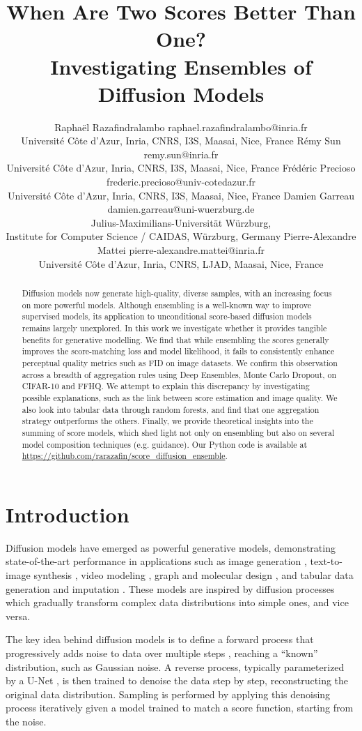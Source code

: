 \documentclass[10pt]{article} %
\title{When Are Two Scores Better Than One? \\ Investigating Ensembles of Diffusion Models}
\author{\name Raphaël Razafindralambo \email raphael.razafindralambo@inria.fr \\
      \addr Université Côte d’Azur, Inria, CNRS, I3S, Maasai, Nice, France
      \AND
      \name Rémy Sun \email remy.sun@inria.fr \\
      \addr Université Côte d’Azur, Inria, CNRS, I3S, Maasai, Nice, France
      \AND
      \name Frédéric Precioso \email frederic.precioso@univ-cotedazur.fr\\
      \addr Université Côte d’Azur, Inria, CNRS, I3S, Maasai, Nice, France
      \AND
      \name Damien Garreau \email damien.garreau@uni-wuerzburg.de\\
      \addr Julius-Maximilians-Universität Würzburg, \\ Institute for Computer Science / CAIDAS, Würzburg, Germany
      \AND
      \name Pierre-Alexandre Mattei \email pierre-alexandre.mattei@inria.fr \\
      \addr Université Côte d’Azur, Inria, CNRS, LJAD, Maasai, Nice, France}
\newcommand{\engquote}[1]{``#1''}
\begin{document}
\maketitle

\begin{abstract}
Diffusion models now generate high-quality, diverse samples, with an increasing focus on more powerful models. Although ensembling is a well-known way to improve supervised models, its application to unconditional score-based diffusion models remains largely unexplored. In this work we investigate whether it provides tangible benefits for generative modelling. We find that while ensembling the scores generally improves the score-matching loss and model likelihood, it fails to consistently enhance perceptual quality metrics such as FID on image datasets. We confirm this observation across a breadth of aggregation rules using Deep Ensembles, Monte Carlo Dropout, on CIFAR-10 and FFHQ. We attempt to explain this discrepancy by investigating possible explanations, such as the link between score estimation and image quality. We also look into tabular data through random forests, and find that one aggregation strategy outperforms the others. Finally, we provide theoretical insights into the summing of score models, which shed light not only on ensembling but also on several model composition techniques (e.g. guidance). Our Python code is available at \url{https://github.com/rarazafin/score_diffusion_ensemble}.
\end{abstract}



\section{Introduction}\label{section: introduction}

Diffusion models have emerged as powerful generative models, demonstrating state-of-the-art performance in applications such as image generation \citep{dhariwal2021diffusion}, text-to-image synthesis \citep{saharia2022photorealistic}, video modeling \citep{ho2022video}, graph and molecular design \citep{liu2023generative}, and tabular data generation and imputation \citep{kim2022stasy, jolicoeur2024generating}. These models are inspired by diffusion processes which gradually transform complex data distributions into simple ones, and vice versa.

The key idea behind diffusion models is to define a forward process that progressively adds noise to data over multiple steps \citep{ho2020denoisingdiffusionprobabilisticmodels,song2021scorebasedgenerativemodelingstochastic}, reaching a \engquote{known} distribution, such as Gaussian noise. A reverse process, typically parameterized by a U-Net \citep{ronneberger2015u}, is then trained to denoise the data step by step, reconstructing the original data distribution. Sampling is performed by applying this denoising process iteratively given a model trained to match a score function, starting from the noise.
\end{document}
